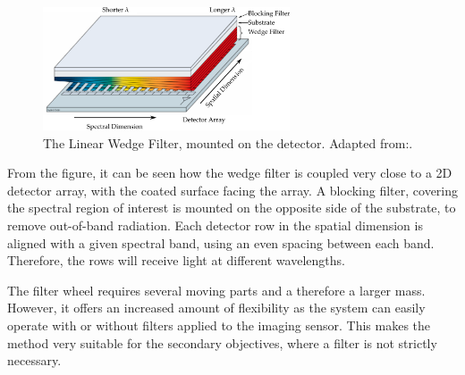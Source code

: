 \begin{figure}[htb]
\centering
\includegraphics[width=0.65\textwidth]{figures/Orbiter/spectrometer_wedge_3}
\caption{The Linear Wedge Filter, mounted on the detector. Adapted from:\cite{puschell1999a}.}
\label{fig:spec_wedge2}
\end{figure}
From the figure, it can be seen how the wedge filter is coupled very close to a 2D detector array, with the coated surface facing the array. A blocking filter, covering the spectral region of interest is mounted on the opposite side of the substrate, to remove out-of-band radiation. Each detector row in the spatial dimension is aligned with a given spectral band, using an even spacing between each band. Therefore, the rows will receive light at different wavelengths.

The filter wheel requires several moving parts and a therefore a larger mass. However, it offers an increased amount of flexibility as the system can easily operate with or without filters applied to the imaging sensor. This makes the method very suitable for the secondary objectives, where a filter is not strictly necessary.

